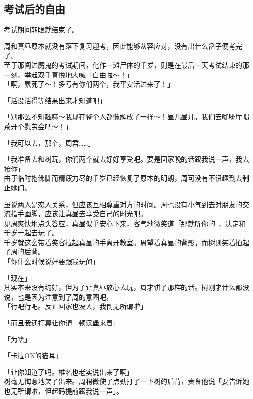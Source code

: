 \subsection{考试后的自由}

考试期间转眼就结束了。

周和真昼原本就没有落下复习迎考，因此能够从容应对，没有出什么岔子便考完了。\\

至于那闯过魔鬼的考试期间，化作一滩尸体的千岁，则是在最后一天考试结束的那一刻，举起双手喜悦地大喊「自由啦～！」\\

「啊，累死了～！多亏有你们两个，我平安活过来了！」

「活没活得等结果出来才知道吧」

「别那么不知趣嘛～我现在整个人都像解放了一样～！昼儿昼儿，我们去咖啡厅喝茶开个慰劳会吧～！」

「我可以去，那个，周君……」

「我准备去和树玩，你们两个就去好好享受吧。要是回家晚的话跟我说一声，我去接你」\\

由于临时抱佛脚而精疲力尽的千岁已经恢复了原本的明朗，周可没有不识趣到去制止她们。

虽说两人是恋人关系，但应该互相尊重对方的时间。周也没有小气到去对朋友的交流指手画脚，应该让真昼去享受自己的时光吧。\\

见周爽快地点头答应，真昼似乎安心下来，客气地微笑道「那就听你的」，决定和千岁一起去玩了。\\

千岁就这么带着笑容拉起真昼的手离开教室。周望着真昼的背影，而树则笑着拍起了周的后背。\\

「你什么时候说好要跟我玩的」

「现在」\\

其实本来没有约好，但为了让真昼放心去玩，周才讲了那样的话。树刚才什么都没说，也是因为注意到了周的意图吧。\\

「行吧行吧。反正回家也没人，我倒无所谓啦」

「而且我还打算让你请一顿汉堡来着」

「为啥」

「卡拉OK的猫耳」

「让你知道了吗。椎名也老实说出来了啊」\\

树毫无悔意地笑了出来。周稍微使了点劲打了一下树的后背，责备他说「要告诉她也无所谓啦，但起码提前跟我说一声」。

